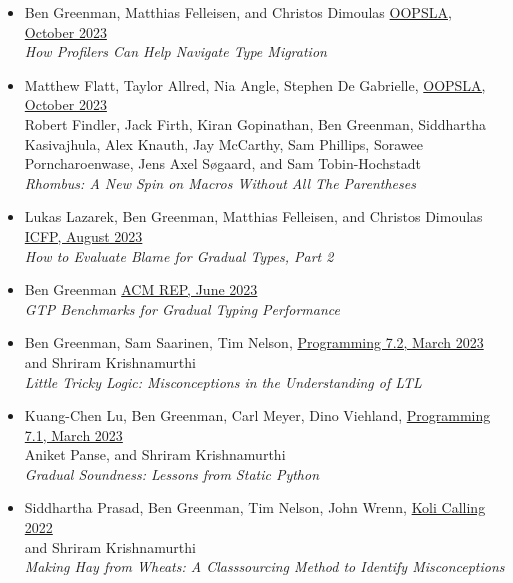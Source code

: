 \documentclass[11pt]{article}
\begin{document}
\begin{itemize}
\item
  Ben Greenman, Matthias Felleisen, and Christos Dimoulas \hfill \href{https://2023.splashcon.org/track/splash-2023-oopsla}{OOPSLA, October 2023} \\
  \emph{How Profilers Can Help Navigate Type Migration} \hfill {}
\item
  Matthew Flatt, Taylor Allred, Nia Angle, Stephen De Gabrielle, \hfill \href{https://2023.splashcon.org/track/splash-2023-oopsla}{OOPSLA, October 2023} \\
  Robert Findler, Jack Firth, Kiran Gopinathan, Ben Greenman, Siddhartha Kasivajhula,
  Alex Knauth, Jay McCarthy, Sam Phillips, Sorawee Porncharoenwase, Jens Axel Søgaard, and Sam Tobin-Hochstadt \\
  \emph{Rhombus: A New Spin on Macros Without All The Parentheses} \hfill {}
\item
  Lukas Lazarek, Ben Greenman, Matthias Felleisen, and Christos Dimoulas \hfill \href{https://icfp23.sigplan.org/}{ICFP, August 2023} \\
  \emph{How to Evaluate Blame for Gradual Types, Part 2} \hfill {}
\item
  Ben Greenman \hfill \href{https://acm-rep.github.io/2023/}{ACM REP, June 2023} \\
    \emph{GTP Benchmarks for Gradual Typing Performance} \hfill {}
\item
  Ben Greenman, Sam Saarinen, Tim Nelson, \hfill \href{https://2023.programming-conference.org/}{Programming 7.2, March 2023} \\
   and Shriram Krishnamurthi  \\ 
    \emph{Little Tricky Logic: Misconceptions in the Understanding of LT\/L} \hfill {}
\item
  Kuang-Chen Lu, Ben Greenman, Carl Meyer, Dino Viehland, \hfill \href{https://2023.programming-conference.org/}{Programming 7.1, March 2023} \\
  Aniket Panse, and Shriram Krishnamurthi \\
    \emph{Gradual Soundness: Lessons from Static Python} \hfill {}
\item
  Siddhartha Prasad, Ben Greenman, Tim Nelson, John Wrenn, \hfill \href{https://www.kolicalling.fi/}{Koli Calling 2022} \\
  and Shriram Krishnamurthi \\
    \emph{Making Hay from Wheats: A Classsourcing Method to Identify Misconceptions} \hfill {}

\end{itemize}
\end{document}
